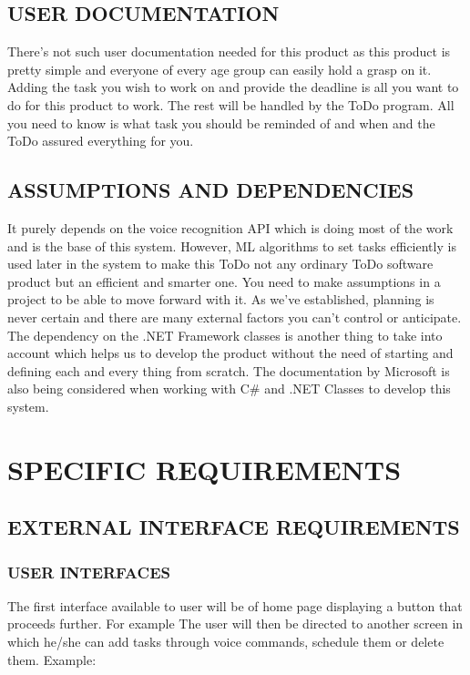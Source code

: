 \documentclass[12pt, a4paper]{report}
\begin{document}
\section{USER DOCUMENTATION   }
There’s not such user documentation needed for this product as this product is pretty simple and everyone of every age group can easily hold a grasp on it. Adding the task you wish to work on and provide the deadline is all you want to do for this product to work. The rest will be handled by the ToDo program. All you need to know is what task you should be reminded of and when and the ToDo assured everything for you.

\section{ASSUMPTIONS AND DEPENDENCIES }
It purely depends on the voice recognition API which is doing most of the work and is the base of this system. However, ML algorithms  to set tasks efficiently is used later in the system to make this ToDo not any ordinary ToDo software product but an efficient and smarter one. You need to make assumptions in a project to be able to move forward with it. As we’ve established, planning is never certain and there are many external factors you can’t control or anticipate. The dependency on the .NET Framework classes  is another thing to take into account which helps us to develop the product without the need of starting and defining each and every thing from scratch. The documentation by Microsoft is also being considered when working with C\# and .NET Classes to develop this system.
\newpage
\chapter{SPECIFIC REQUIREMENTS}
\section{EXTERNAL INTERFACE REQUIREMENTS}
\subsection{USER INTERFACES }
The first interface available to user will be of home page displaying a button that proceeds further. \newline For example \newline The user will then be directed to another screen in which he/she can add tasks through voice commands, schedule them or delete them. \newline Example:
\end{document}
